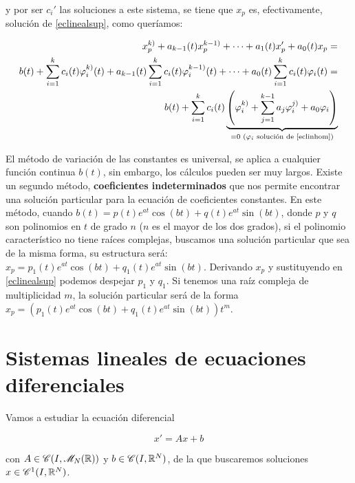 y por ser $c_i'$ las soluciones a este sistema, se tiene que $x_p$ es, efectivamente, solución de \eqref{eclinealsup}, como queríamos:

\begin{align*}
  x_p^{k)} + a_{k-1}(t)x_p^{k-1)} + \dots + a_1(t)x_p' + a_0(t)x_p =\\
  b(t) + \sum_{i=1}^k c_i(t) \varphi_i^{k)}(t) + a_{k-1}(t)\sum_{i=1}^k c_i(t) \varphi_i^{k-1)}(t) + \dots + a_{0}(t)\sum_{i=1}^k c_i(t) \varphi_i(t) =\\
  b(t) + \sum_{i=1}^k c_i(t) \underbrace{ \left( \varphi_i^{k)} + \sum_{j=1}^{k-1}a_j \varphi_i^{j)} + a_0\varphi_i\right)}_{=0 \text{ ($\varphi_i$ solución de \eqref{eclinhom})} }  
\end{align*}

El método de variación de las constantes es universal, se aplica a cualquier función continua $b(t)$, sin embargo, los cálculos pueden ser muy largos. Existe un segundo método, \textbf{coeficientes indeterminados} que nos permite encontrar una solución particular para la ecuación de coeficientes constantes. En este método, cuando $b(t) = p(t)e^{at}\cos(bt) + q(t)e^{at}\sin(bt)$, donde $p$ y $q$ son polinomios en $t$ de grado $n$ ($n$ es el mayor de los dos grados), si el polinomio característico no tiene raíces complejas, buscamos una solución particular que sea de la misma forma, su estructura será: $x_p = p_1(t)e^{at}\cos(bt) + q_1(t)e^{at}\sin(bt)$. Derivando $x_p$ y sustituyendo en \eqref{eclinealsup} podemos despejar $p_1$ y $q_1$. Si tenemos una raíz compleja de multiplicidad $m$, la solución particular será de la forma $x_p = \left(p_1(t)e^{at}\cos(bt) + q_1(t)e^{at}\sin(bt)\right)t^m$.

\section{Sistemas lineales de ecuaciones diferenciales}

Vamos a estudiar la ecuación diferencial

\[x' = Ax+b \tag{S} \label{sistemaedf} \]

con $A\in \mathscr{C}(I, \mathscr{M}_N(\mathbb{R}))$ y $b\in \mathscr{C}(I, \mathbb{R}^N)$, de la que buscaremos soluciones $x\in \mathscr{C}^1(I, \mathbb{R}^N)$.

